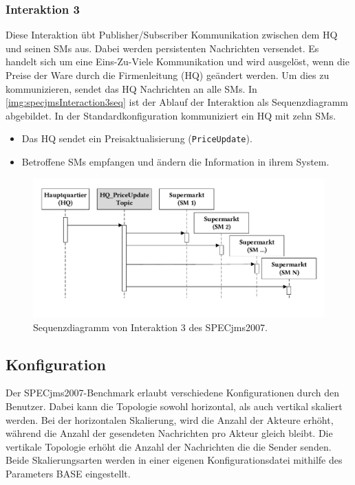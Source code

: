 \subsubsection{Interaktion 3}
\label{sec:interaction3desc}
Diese Interaktion übt Publisher/Subscriber Kommunikation zwischen dem HQ und seinen SMs aus. Dabei werden persistenten Nachrichten versendet. Es handelt sich um eine Eins-Zu-Viele Kommunikation und wird ausgelöst, wenn die Preise der Ware durch die Firmenleitung (HQ) geändert werden. Um dies zu kommunizieren, sendet das HQ Nachrichten an alle SMs. In \autoref{img:specjmsInteraction3seq} ist der Ablauf der Interaktion als Sequenzdiagramm abgebildet. In der Standardkonfiguration kommuniziert ein HQ mit zehn SMs.
\begin{itemize}
    \item Das HQ sendet ein Preisaktualisierung (\texttt{PriceUpdate}).
    \item Betroffene SMs empfangen und ändern die Information in ihrem System.
\end{itemize}


\begin{figure}
\center
  \includegraphics[width=1\textwidth]{images/evaluation/specjms/evaluationInteraktion3seq.pdf}
  \caption{Sequenzdiagramm von Interaktion 3 des SPECjms2007.}
  \label{img:specjmsInteraction3seq}
\end{figure}


\subsection{Konfiguration}
Der SPECjms2007-Benchmark erlaubt verschiedene Konfigurationen durch den Benutzer. Dabei kann die Topologie sowohl horizontal, als auch vertikal skaliert werden. Bei der horizontalen Skalierung, wird die Anzahl der Akteure erhöht, während die Anzahl der gesendeten Nachrichten pro Akteur gleich bleibt. Die vertikale Topologie erhöht die Anzahl der Nachrichten die die Sender senden. Beide Skalierungsarten werden in einer eigenen Konfigurationsdatei mithilfe des Parameters BASE eingestellt.


